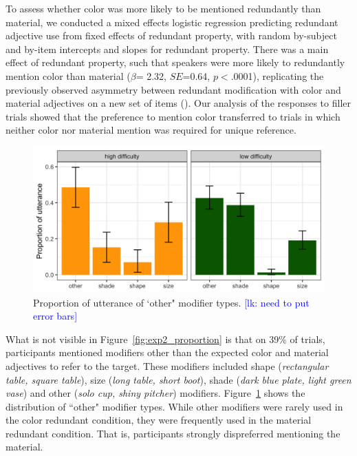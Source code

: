 \documentclass[12pt,letterpaper]{article}
\newcommand{\lk}[1]{\textcolor{Blue}{[lk: #1]}}
\begin{document}
To assess whether color was more likely to be mentioned redundantly than material, we conducted a mixed effects logistic regression predicting redundant adjective use from fixed effects of redundant property, with random by-subject and by-item intercepts and slopes for redundant property. There was a main effect of redundant property, such that speakers were more likely to redundantly mention color than material ($\beta$= 2.32, $SE$=0.64, $p$$<$.0001), replicating the previously observed asymmetry between redundant modification with color and material adjectives on a new set of items (\citealt{Sedivy2005,EttingerFernandez2020}). Our analysis of the responses to filler trials showed that the preference to mention color transferred to trials in which neither color nor material mention was required for unique reference.

\begin{figure}[ht]
   \centering
   \includegraphics[width=.8\textwidth]{plots/exp2_other_distribution.png}
   \caption{Proportion of utterance of `other" modifier types. \lk{need to put error bars}}
   \label{fig:exp2_other}
   \end{figure}

What is not visible in Figure~\ref{fig:exp2_proportion} is that on 39\% of trials, participants mentioned  modifiers other than the expected color and material adjectives to refer to the target. These modifiers included shape (\textit{rectangular table, square table}), size (\textit{long table, short boot}), shade (\textit{dark blue plate, light green vase}) and other (\textit{solo cup, shiny pitcher}) modifiers. Figure~\ref{fig:exp2_other} shows the distribution of ``other" modifier types. While other modifiers were rarely used in the color redundant condition, they were frequently used in the material redundant condition. That is, participants strongly dispreferred mentioning the material.

\end{document}

